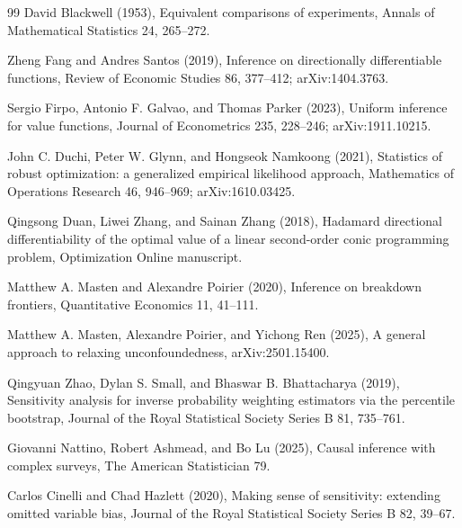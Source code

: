 \documentclass{article}
\begin{document}
\begin{thebibliography}{99}
   David Blackwell (1953), Equivalent comparisons of experiments, Annals of Mathematical Statistics 24, 265--272.

   Zheng Fang and Andres Santos (2019), Inference on directionally differentiable functions, Review of Economic Studies 86, 377--412; arXiv:1404.3763.

   Sergio Firpo, Antonio F. Galvao, and Thomas Parker (2023), Uniform inference for value functions, Journal of Econometrics 235, 228--246; arXiv:1911.10215.

   John C. Duchi, Peter W. Glynn, and Hongseok Namkoong (2021), Statistics of robust optimization: a generalized empirical likelihood approach, Mathematics of Operations Research 46, 946--969; arXiv:1610.03425.

   Qingsong Duan, Liwei Zhang, and Sainan Zhang (2018), Hadamard directional differentiability of the optimal value of a linear second-order conic programming problem, Optimization Online manuscript.

   Matthew A. Masten and Alexandre Poirier (2020), Inference on breakdown frontiers, Quantitative Economics 11, 41--111.

   Matthew A. Masten, Alexandre Poirier, and Yichong Ren (2025), A general approach to relaxing unconfoundedness, arXiv:2501.15400.

   Qingyuan Zhao, Dylan S. Small, and Bhaswar B. Bhattacharya (2019), Sensitivity analysis for inverse probability weighting estimators via the percentile bootstrap, Journal of the Royal Statistical Society Series B 81, 735--761.

   Giovanni Nattino, Robert Ashmead, and Bo Lu (2025), Causal inference with complex surveys, The American Statistician 79.

   Carlos Cinelli and Chad Hazlett (2020), Making sense of sensitivity: extending omitted variable bias, Journal of the Royal Statistical Society Series B 82, 39--67.

\end{thebibliography}
\end{document}
